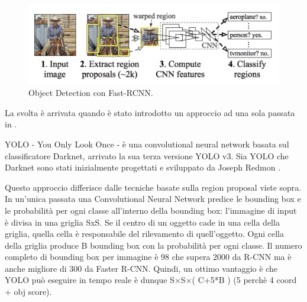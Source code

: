 \begin{figure}[htb]
	\centering
	\includegraphics[width = 120mm]{images/2step_od.png}
	\caption{Object Detection con Fast-RCNN.}
	\label{2step_od}
\end{figure}


La svolta è arrivata quando è stato introdotto un approccio ad una sola passata in \cite{redmon2016you}.

YOLO - You Only Look Once - è una convolutional neural network basata sul classificatore Darknet, arrivato la sua terza versione YOLO v3. Sia YOLO che Darknet sono stati inizialmente progettati e sviluppato da Joseph Redmon \cite{redmon2016you}.

Questo approccio differisce dalle tecniche basate sulla region proposal viste sopra. In un'unica passata una Convolutional Neural Network predice le bounding box e le probabilità per ogni classe all'interno della bounding box: l'immagine di input è divisa in una griglia SxS. Se il centro di un oggetto cade in una cella della griglia, quella cella è responsabile del rilevamento di quell'oggetto. Ogni cella della griglia produce B bounding box con la probabilità per ogni classe. Il numero completo di bounding box per immagine è 98 che supera 2000 da R-CNN ma è anche migliore di 300 da Faster R-CNN. Quindi, un ottimo vantaggio è che YOLO può eseguire in tempo reale è dunque S×S×( C+5*B ) (5 perchè 4 coord + obj score).

